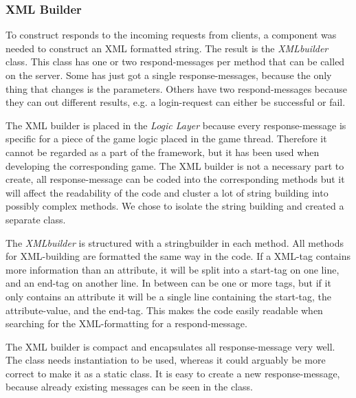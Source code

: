 \subsubsection{XML Builder}
\label{sec:xmlbuilderimpl}
To construct responds to the incoming requests from clients, a component was needed to construct an XML formatted string. The result is the \textit{XMLbuilder} class. This class has one or two respond-messages per method that can be called on the server. Some has just got a single response-messages, because the only thing that changes is the parameters. Others have two respond-messages because they can out different results, e.g. a login-request can either be successful or fail. 

The XML builder is placed in the \textit{Logic Layer} because every response-message is specific for a piece of the game logic placed in the game thread. Therefore it cannot be regarded as a part of the framework, but it has been used when developing the corresponding game. The XML builder is not a necessary part to create, all response-message can be coded into the corresponding methods but it will affect the readability of the code and cluster a lot of string building into possibly complex methods. We chose to isolate the string building and created a separate class.

The \textit{XMLbuilder} is structured with a stringbuilder in each method. All methods for XML-building are formatted the same way in the code. If a XML-tag contains more information than an attribute, it will be split into a start-tag on one line, and an end-tag on another line. In between can be one or more tags, but if it only contains an attribute it will be a single line containing the start-tag, the attribute-value, and the end-tag. This makes the code easily readable when searching for the XML-formatting for a respond-message. 

The XML builder is compact and encapsulates all response-message very well. The class needs instantiation to be used, whereas it could arguably be more correct to make it as a static class. It is easy to create a new response-message, because already existing messages can be seen in the class.